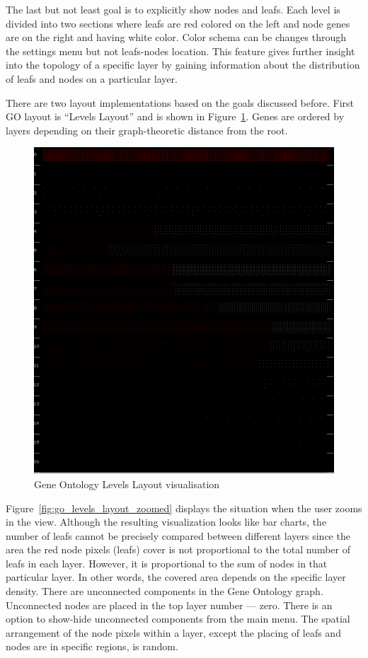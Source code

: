 The last but not least goal is to explicitly show nodes and leafs. Each level is divided into two sections where leafs are red colored on the left and node genes are on the right and having white color.
Color schema can be changes through the settings menu but not leafs-nodes location.
This feature gives further insight into the topology of a specific layer by gaining information about the distribution of leafs and nodes on a particular layer.

There are two layout implementations based on the goals discussed before. First GO layout is ``Levels Layout'' and is shown in Figure~\ref{fig:go_levels_layout}.
Genes are ordered by layers depending on their graph-theoretic distance from the root.

\begin{figure}[h!]
\centering
\includegraphics[scale=0.3]{pictures/go_levels_layout.png}
\caption{Gene Ontology Levels Layout visualisation}
\label{fig:go_levels_layout}
\end{figure}

Figure~\ref{fig:go_levels_layout_zoomed} displays the situation when the user zooms in the view.
Although the resulting visualization looks like bar charts, the number of leafs cannot be precisely compared between different layers since
the area the red node pixels (leafs) cover is not proportional to the total number of leafs in each layer.
However, it is proportional to the sum of nodes in that particular layer. In other words, the covered area depends on the specific layer density.
There are unconnected components in the Gene Ontology graph.
Unconnected nodes are placed in the top layer number --- zero. There is an option to show-hide unconnected components from the main menu.
The spatial arrangement of the node pixels within a layer, except the placing of leafs and nodes are in specific regions, is random.

